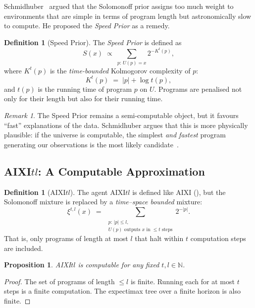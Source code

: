 \documentclass[11pt,a4paper]{article}
\newtheorem{proposition}[theorem]{Proposition}
\theoremstyle{definition}
\newtheorem{definition}[theorem]{Definition}
\theoremstyle{remark}
\newtheorem{remark}[theorem]{Remark}
\newcommand{\Nat}{\mathbb{N}}
\begin{document}
Schmidhuber~\cite{Schmidhuber2002} argued that the Solomonoff prior assigns
too much weight to environments that are simple in terms of program length but
astronomically slow to compute.  He proposed the \emph{Speed Prior} as a
remedy.

\begin{definition}[Speed Prior]\label{def:speed}
The \emph{Speed Prior} is defined as
\[
  S(x) \;\propto\; \sum_{p:\,U(p)=x} 2^{-K^t(p)},
\]
where $K^t(p)$ is the \emph{time-bounded} Kolmogorov complexity of $p$:
\[
  K^t(p) \;=\; |p| + \log t(p),
\]
and $t(p)$ is the running time of program $p$ on $U$.  Programs are penalised
not only for their length but also for their running time.
\end{definition}

\begin{remark}
The Speed Prior remains a semi-computable object, but it favours
``fast'' explanations of the data.  Schmidhuber argues that this is more
physically plausible: if the universe is computable, the simplest
\emph{and fastest} program generating our observations is the most likely
candidate~\cite{Schmidhuber2002}.
\end{remark}

\subsection[AIXItl: A Computable Approximation]{AIXI\boldmath$tl$: A Computable Approximation}\label{sec:aixitl}

\begin{definition}[AIXI$tl$]\label{def:aixitl}
The agent AIXI$tl$ is defined like AIXI (), but the
Solomonoff mixture is replaced by a \emph{time--space bounded} mixture:
\[
  \xi^{t,l}(x) \;=\; \sum_{\substack{p:\,|p|\le l,\\U(p)\text{ outputs }x\text{ in }\le t\text{ steps}}} 2^{-|p|}.
\]
That is, only programs of length at most $l$ that halt within $t$ computation
steps are included.
\end{definition}

\begin{proposition}
AIXI$tl$ is computable for any fixed $t,l\in\Nat$.
\end{proposition}

\begin{proof}
The set of programs of length $\le l$ is finite.  Running each for at most
$t$ steps is a finite computation.  The expectimax tree over a finite
horizon is also finite.
\end{proof}
\end{document}
